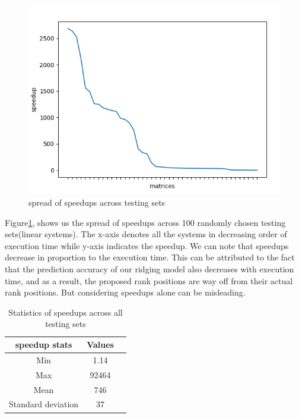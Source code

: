\begin{figure}
    \centering
    \includegraphics[width=1\columnwidth]{figures/speedup_graph.png}
    \caption{spread of speedups across testing sets}
    \label{spread of speedups across testing sets}
\end{figure}

Figure\ref{spread of speedups across testing sets}, shows us the spread of speedups across 100 randomly chosen testing sets(linear systems). The x-axis denotes all the systems in decreasing order of execution time while y-axis indicates the speedup. We can note that speedups decrease in proportion to the execution time. This can be attributed to the fact that the prediction accuracy of our ridging model also decreases with execution time, and as a result, the proposed rank positions are way off from their actual rank positions. But considering speedups alone can be misleading. 



\begin{table}
\centering
\caption{Statistics of speedups across all testing sets}
\label{Statistics of speedups across all testing sets}
\begin{tabular}{|c|c|c|}    \hline  

speedup stats                                 & Values\\ \hline\hline
Min                         & 1.14 \\ \hline
Max                                       & 92464  \\ \hline
Mean                                       & 746  \\ \hline
Standard deviation                                          & 37\\ \hline

\end{tabular}
\end{table}

